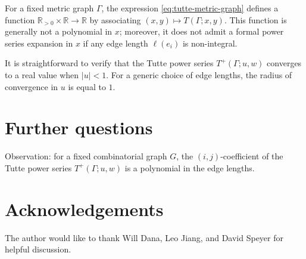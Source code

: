 \documentclass{amsart}
\theoremstyle{definition}
\newcommand{\RR}{\mathbb{R}}
\newcommand{\RRpos}{\RR_{>0}}
\newcommand{\harry}[1]{{\color{red} \sf $\diamondsuit$  {#1} $\diamondsuit$ }}
\newcommand{\note}[1]{\harry{#1}}
\begin{document}
For a fixed metric graph $\Gamma$,
the expression \eqref{eq:tutte-metric-graph} defines a function
$\RRpos\times \RR \to \RR$
by associating $(x,y) \mapsto T(\Gamma; x,y)$. 
This function is generally not a polynomial in $x$; %
moreover,  it does not admit a formal power series expansion in $x$ 
if any edge length $\ell(e_i)$ is non-integral.

It is straightforward to verify that the Tutte power series $T^+(\Gamma;u,w)$ converges to a real value when $|u|<1$.
For a generic choice of edge lengths, %
the radius of convergence in $u$ is equal to $1$.


\section{Further questions}

Observation: for a fixed combinatorial graph $G$, the $(i,j)$-coefficient of the Tutte power series $T^+(\Gamma; u,w)$ is a polynomial in the edge lengths.

\section*{Acknowledgements}
The author would like to thank 
Will Dana, Leo Jiang, and
David Speyer for helpful discussion.


 

\end{document}
